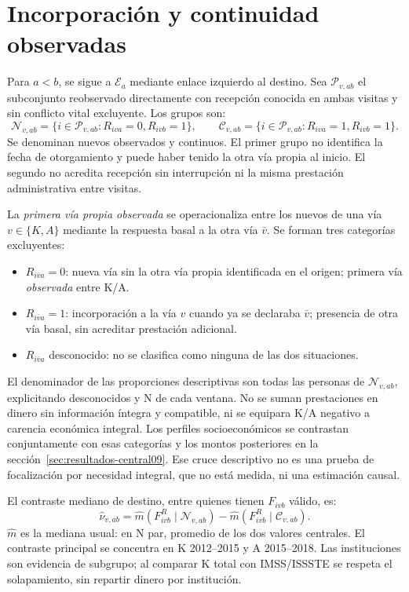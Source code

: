 \section{Incorporación y continuidad observadas}
\label{sec:transiciones-monetarias}

Para $a<b$, se sigue a $\mathcal E_a$ mediante enlace izquierdo al destino.
Sea $\mathcal P_{v,ab}$ el subconjunto reobservado directamente con recepción
conocida en ambas visitas y sin conflicto vital excluyente. Los grupos son:
\begin{equation}
 \mathcal N_{v,ab}=\{i\in\mathcal P_{v,ab}:R_{iva}=0,R_{ivb}=1\},\qquad
 \mathcal C_{v,ab}=\{i\in\mathcal P_{v,ab}:R_{iva}=1,R_{ivb}=1\}.
 \label{eq:nuevos-continuos}
\end{equation}
Se denominan nuevos observados y continuos. El primer grupo no identifica
la fecha de otorgamiento y puede haber tenido la otra vía propia al inicio.
El segundo no acredita recepción sin interrupción ni la misma prestación
administrativa entre visitas.

La \emph{primera vía propia observada} se operacionaliza entre los
nuevos de una vía $v\in\{K,A\}$ mediante la respuesta basal a la otra
vía $\bar v$. Se forman tres categorías excluyentes:
\begin{itemize}
\item $R_{i\bar v a}=0$: nueva vía sin la otra vía propia identificada
en el origen; primera vía \emph{observada} entre K/A.
\item $R_{i\bar v a}=1$: incorporación a la vía $v$ cuando ya se
declaraba $\bar v$; presencia de otra vía basal, sin acreditar prestación adicional.
\item $R_{i\bar v a}$ desconocido: no se clasifica como ninguna de
las dos situaciones.
\end{itemize}
El denominador de las proporciones descriptivas son todas las personas
de $\mathcal N_{v,ab}$, explicitando desconocidos y N de cada ventana.
No se suman prestaciones en dinero sin información íntegra y compatible,
ni se equipara K/A negativo a carencia económica integral. Los perfiles socioeconómicos se contrastan conjuntamente con esas categorías
y los montos posteriores en la sección~\ref{sec:resultados-central09}. Ese
cruce descriptivo no es una prueba de focalización por necesidad integral,
que no está medida, ni una estimación causal.

El contraste mediano de destino, entre quienes tienen $F_{ivb}$ válido, es:
\begin{equation}
 \widehat\nu_{v,ab}
 =\widehat m(F^R_{ivb}\mid\mathcal N_{v,ab})
 -\widehat m(F^R_{ivb}\mid\mathcal C_{v,ab}).
 \label{eq:contraste-nuevos}
\end{equation}
$\widehat m$ es la mediana usual: en N par, promedio de los dos valores
centrales. El contraste principal se concentra en K 2012--2015 y A 2015--2018.
Las instituciones son evidencia de subgrupo; al comparar K total con
IMSS/ISSSTE se respeta el solapamiento, sin repartir dinero por institución.

